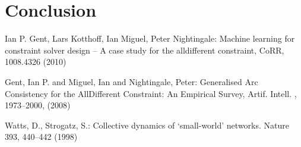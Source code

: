 \documentclass{llncs}
\begin{document}
\section{Conclusion}
%

\clearpage
%
%
\begin{thebibliography}{5}
%

Ian P. Gent, Lars Kotthoff, Ian Miguel, Peter Nightingale:
Machine learning for constraint solver design -- {A} case study for the alldifferent constraint,
CoRR, 1008.4326 (2010)

Gent, Ian P. and Miguel, Ian and Nightingale, Peter:
Generalised Arc Consistency for the AllDifferent Constraint: An Empirical Survey,
Artif. Intell. , 1973--2000, (2008)

Watts, D., Strogatz, S.:
Collective dynamics of ‘small-world’ networks. Nature 393,
440–442 (1998)

\end{thebibliography}
% 
\end{document}

